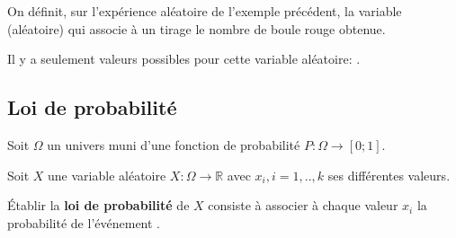 \documentclass{beamer}
\begin{document}
  \begin{frame}
    \begin{example}
   
   On définit, sur l'expérience aléatoire de l'exemple précédent, la variable (aléatoire) qui
   associe à un tirage le nombre de boule rouge obtenue.
   
   Il y a seulement  valeurs possibles pour cette variable aléatoire: .
  
   \end{example}
  \end{frame}
  
  \subsection{Loi de probabilité}
  
  \begin{frame}
  \begin{definition} 
    
   Soit $\Omega$ un univers muni d'une fonction de probabilité $P:\Omega \to [0;1]$.
   
   Soit $X$ une variable aléatoire $X:\Omega \to \mathbb{R}$ avec $x_i,i=1,..,k$ ses différentes 
   valeurs.
   
   \'Etablir la \textbf{loi de probabilité} de $X$ consiste à associer à chaque valeur $x_i$ la probabilité
   de l'événement .
   
   \end{definition}
   
   \end{frame}
   
\end{document}
